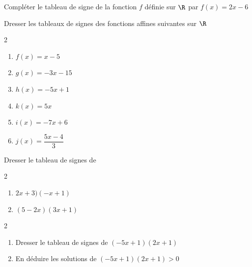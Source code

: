 \exo 

Compléter le tableau de signe de la fonction $f$ définie sur $\R$ par $f(x)= 2x - 6$

\medskip

\begin{center}
\end{center}

\exo

Dresser les tableaux de signes des fonctions affines suivantes sur $\R$

\begin{multicols}{2}
\begin{enumerate}
\item $f(x) = x-5$
\item $g(x)= -3x -15$
\item $h(x)= -5x +1$
\item $k(x)= 5x$
\item $i(x)= -7x +6$
\item $j(x)= \dfrac{5x -4}{3}$
\end{enumerate}
\end{multicols}

\medskip

\exo

Dresser le tableau de signes de 

\begin{multicols}{2}
\begin{enumerate}
\item $2x+3)(-x+1)$
\item $(5-2x)(3x+1)$
\end{enumerate}
\end{multicols}

\medskip

\exo 

\begin{multicols}{2}
\begin{enumerate}
\item Dresser le tableau de signes de $(-5x+1)(2x+1)$
\item En déduire les solutions de $(-5x+1)(2x+1)>0$
\end{enumerate}
\end{multicols}

\medskip

\exo

